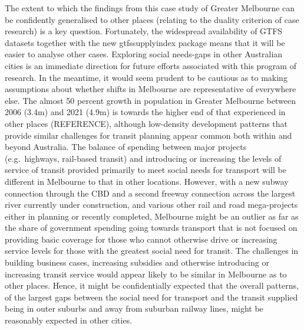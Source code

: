 \documentclass[preprint, 3p,
authoryear]{elsarticle} %
\begin{document}
The extent to which the findings from this case study of Greater
Melbourne can be confidently generalised to other places (relating to
the duality criterion of case research) is a key question. Fortunately,
the widespread availability of GTFS datasets together with the new
gtfssupplyindex package means that it will be easier to analyse other
cases. Exploring social needs-gaps in other Australian cities is an
immediate direction for future efforts associated with this program of
research. In the meantime, it would seem prudent to be cautious as to
making assumptions about whether shifts in Melbourne are representative
of everywhere else. The almost 50 percent growth in population in
Greater Melbourne between 2006 (3.4m) and 2021 (4.9m) is towards the
higher end of that experienced in other places (REFERENCE), although
low-density development patterns that provide similar challenges for
transit planning appear common both within and beyond Australia. The
balance of spending between major projects (e.g.~highways, rail-based
transit) and introducing or increasing the levels of service of transit
provided primarily to meet social needs for transport will be different
in Melbourne to that in other locations. However, with a new subway
connection through the CBD and a second freeway connection across the
largest river currently under construction, and various other rail and
road mega-projects either in planning or recently completed, Melbourne
might be an outlier as far as the share of government spending going
towards transport that is not focused on providing basic coverage for
those who cannot otherwise drive or increasing service levels for those
with the greatest social need for transit. The challenges in building
business cases, increasing subsidies and otherwise introducing or
increasing transit service would appear likely to be similar in
Melbourne as to other places. Hence, it might be confidentially expected
that the overall patterns, of the largest gaps between the social need
for transport and the transit supplied being in outer suburbs and away
from suburban railway lines, might be reasonably expected in other
cities.
\end{document}
